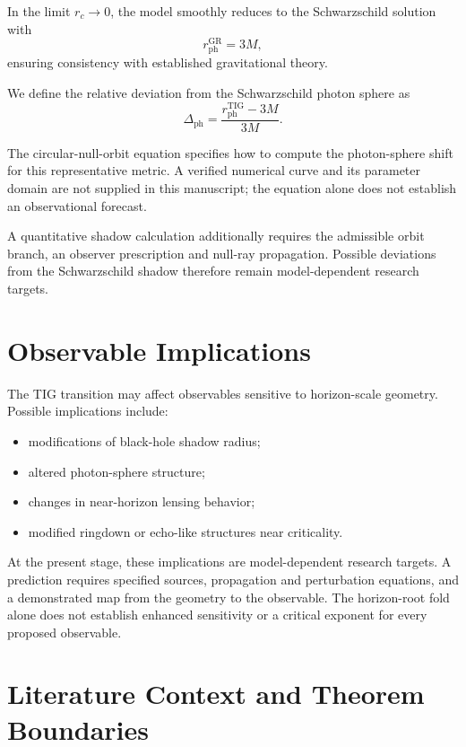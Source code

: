 \documentclass[11pt,a4paper]{article}
\begin{document}
In the limit \(r_c \to 0\), the model smoothly reduces to the Schwarzschild
solution with
\begin{equation}
r_{\mathrm{ph}}^{\mathrm{GR}} = 3M,
\end{equation}
ensuring consistency with established gravitational theory.

We define the relative deviation from the Schwarzschild photon sphere as
\begin{equation}
\Delta_{\mathrm{ph}} =
\frac{r_{\mathrm{ph}}^{\mathrm{TIG}} - 3M}{3M}.
\end{equation}

The circular-null-orbit equation specifies how to compute the photon-sphere
shift for this representative metric. A verified numerical curve and its
parameter domain are not supplied in this manuscript; the equation alone does
not establish an observational forecast.

A quantitative shadow calculation additionally requires the admissible orbit
branch, an observer prescription and null-ray propagation. Possible deviations
from the Schwarzschild shadow therefore remain model-dependent research targets.

\section{Observable Implications}

The TIG transition may affect observables sensitive to horizon-scale geometry.
Possible implications include:
\begin{itemize}
\item modifications of black-hole shadow radius;
\item altered photon-sphere structure;
\item changes in near-horizon lensing behavior;
\item modified ringdown or echo-like structures near criticality.
\end{itemize}

At the present stage, these implications are model-dependent research targets.
A prediction requires specified sources, propagation and perturbation equations,
and a demonstrated map from the geometry to the observable. The horizon-root
fold alone does not establish enhanced sensitivity or a critical exponent for
every proposed observable.

\section{Literature Context and Theorem Boundaries}
\end{document}
